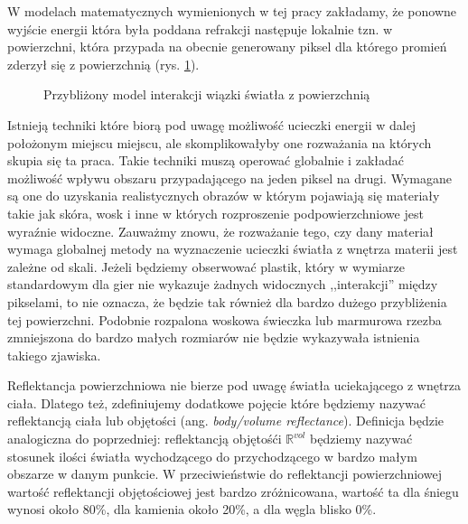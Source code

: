 \documentclass[../main.tex]{subfiles}
\begin{document}
W modelach matematycznych wymienionych w tej pracy zakładamy, że ponowne wyjście energii która była poddana refrakcji następuje lokalnie tzn. w powierzchni, która przypada na obecnie generowany piksel dla którego promień zderzył się z powierzchnią (rys. \ref{fig:ReflectionRefraction}).

\begin{figure}[h]
  \centering
  \caption{Przybliżony model interakcji wiązki światła z powierzchnią}
  \label{fig:ReflectionRefraction}
\end{figure}

Istnieją techniki które biorą pod uwagę możliwość ucieczki energii w dalej położonym miejscu miejscu, ale skomplikowałyby one rozważania na których skupia się ta praca. Takie techniki muszą operować globalnie i zakładać możliwość wpływu obszaru przypadającego na jeden piksel na drugi. Wymagane są one do uzyskania realistycznych obrazów w którym pojawiają się materiały takie jak skóra, wosk i inne w których rozproszenie podpowierzchniowe jest wyraźnie widoczne. Zauważmy znowu, że rozważanie tego, czy dany materiał wymaga globalnej metody na wyznaczenie ucieczki światła z wnętrza materii jest zależne od skali. Jeżeli będziemy obserwować plastik, który w wymiarze standardowym dla gier nie wykazuje żadnych widocznych ,,interakcji'' między pikselami, to nie oznacza, że będzie tak również dla bardzo dużego przybliżenia tej powierzchni. Podobnie rozpalona woskowa świeczka lub marmurowa rzezba zmniejszona do bardzo małych rozmiarów nie będzie wykazywała istnienia takiego zjawiska.

Reflektancja powierzchniowa nie bierze pod uwagę światła uciekającego z wnętrza ciała. Dlatego też, zdefiniujemy dodatkowe pojęcie które będziemy nazywać reflektancją ciała lub objętości (ang. \textit{body/volume reflectance}). Definicja będzie analogiczna do poprzedniej: reflektancją objętośći $\mathbb{R}^{\textit{vol}}$ będziemy nazywać stosunek ilości światła wychodzącego do przychodzącego w bardzo małym obszarze w danym punkcie. W przeciwieństwie do reflektancji powierzchniowej wartość reflektancji objętościowej jest bardzo zróżnicowana, wartość ta dla śniegu wynosi około 80\%, dla kamienia około 20\%, a dla węgla blisko 0\%.
\end{document}
